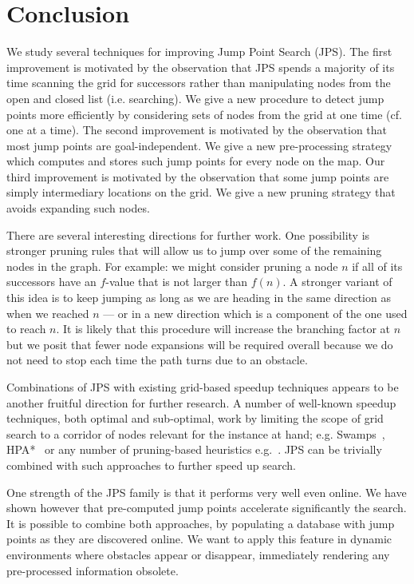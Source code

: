 \section{Conclusion}
\label{sec::conclusion}

We study several techniques for improving Jump Point Search (JPS).  
The first improvement is motivated by the observation that JPS spends
a majority of its time scanning the grid for successors rather than
manipulating nodes from the open and closed list (i.e. searching). 
We give a new procedure to detect jump points more efficiently
by considering sets of nodes from the grid at one time (cf. one at a time).
The second improvement is motivated by the observation that most jump
points are goal-independent. We give a new pre-processing strategy
which computes and stores such jump points for every node on the map.  
Our third improvement is motivated by the observation that some
jump points are simply intermediary locations on the grid. We give a new 
pruning strategy that avoids expanding such nodes.

There are several interesting directions for further work. One possibility is
stronger pruning rules that will allow us to jump over some of the remaining
nodes in the graph. For example: we might consider %
pruning a node $n$ if all of its successors have
an $f$-value that is not larger than $f(n)$. A stronger variant of this idea
is to keep jumping as long as we are heading in the same direction as when we
reached $n$ --- or in a new direction which is a component of the one used to
reach $n$. It is likely that this procedure will increase the branching factor
at $n$ but we posit that fewer node expansions will be required overall because
we do not need to stop each time the path turns due to an obstacle.

Combinations of JPS with existing grid-based speedup 
techniques appears to be another fruitful direction for further research. 
A number of well-known speedup techniques, both optimal and sub-optimal,
work by limiting the scope of grid search to a corridor of nodes relevant
for the instance at hand; e.g. Swamps~\cite{pochter10}, HPA{*}~\cite{botea04}
or any number of pruning-based heuristics e.g.~\cite{bjornsson06,goldenberg10}.
JPS can be trivially combined with such approaches to further speed up search.

One strength of the JPS family is that it performs very well even online.  We
have shown however that pre-computed jump points accelerate significantly the
search.  It is possible to combine both approaches, by populating a database
with jump points as they are discovered online.  We want to apply this feature
in dynamic environments where obstacles appear or disappear, immediately
rendering any pre-processed information obsolete.

